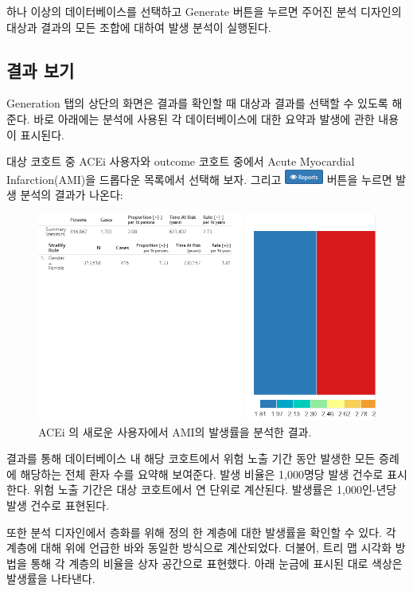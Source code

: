 \documentclass[10.5pt]{book}
\theoremstyle{definition}
\theoremstyle{definition}
\theoremstyle{definition}
\theoremstyle{remark}
\begin{document}
하나 이상의 데이터베이스를 선택하고 Generate 버튼을 누르면 주어진 분석
디자인의 대상과 결과의 모든 조합에 대하여 발생 분석이 실행된다.

\subsection{결과 보기}\label{-}

Generation 탭의 상단의 화면은 결과를 확인할 때 대상과 결과를 선택할 수
있도록 해준다. 바로 아래에는 분석에 사용된 각 데이터베이스에 대한 요약과
발생에 관한 내용이 표시된다.

대상 코호트 중 ACEi 사용자와 outcome 코호트 중에서 Acute Myocardial
Infarction(AMI)을 드롭다운 목록에서 선택해 보자. 그리고
\includegraphics{images/Characterization/atlasIncidenceReportButton.png}
버튼을 누르면 발생 분석의 결과가 나온다:

\begin{figure}

{\centering \includegraphics[width=1\linewidth]{images/Characterization/atlasIncidenceResults} 

}

\caption{ACEi 의 새로운 사용자에서 AMI의 발생률을 분석한 결과.}\label{fig:atlasIncidenceResults}
\end{figure}

결과를 통해 데이터베이스 내 해당 코호트에서 위험 노출 기간 동안 발생한
모든 증례에 해당하는 전체 환자 수를 요약해 보여준다. 발생 비율은
1,000명당 발생 건수로 표시한다. 위험 노출 기간은 대상 코호트에서 연
단위로 계산된다. 발생률은 1,000인-년당 발생 건수로 표현된다.

또한 분석 디자인에서 층화를 위해 정의 한 계층에 대한 발생률을 확인할 수
있다. 각 계층에 대해 위에 언급한 바와 동일한 방식으로 계산되었다.
더불어, 트리 맵 시각화 방법을 통해 각 계층의 비율을 상자 공간으로
표현했다. 아래 눈금에 표시된 대로 색상은 발생률을 나타낸다.
\end{document}
